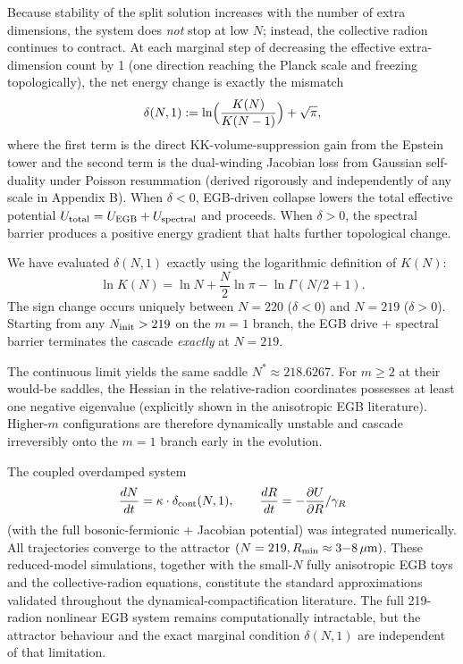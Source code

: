 \documentclass[12pt,a4paper]{article}
\begin{document}
Because stability of the split solution increases with the number of extra dimensions, the system does \emph{not} stop at low \(N\); instead, the collective radion continues to contract. At each marginal step of decreasing the effective extra-dimension count by 1 (one direction reaching the Planck scale and freezing topologically), the net energy change is exactly the mismatch
\[
\delta(N,1):=\ln\Bigl(\frac{K(N)}{K(N-1)}\Bigr)+\sqrt{\pi},
\]
where the first term is the direct KK-volume-suppression gain from the Epstein tower and the second term is the dual-winding Jacobian loss from Gaussian self-duality under Poisson resummation (derived rigorously and independently of any scale in Appendix B). When \(\delta<0\), EGB-driven collapse lowers the total effective potential \(U_{\rm total}=U_{\rm EGB}+U_{\rm spectral}\) and proceeds. When \(\delta>0\), the spectral barrier produces a positive energy gradient that halts further topological change.

We have evaluated \(\delta(N,1)\) exactly using the logarithmic definition of \(K(N)\):
\[
\ln K(N) = \ln N + \frac{N}{2}\ln\pi - \ln\Gamma(N/2+1).
\]
The sign change occurs uniquely between \(N=220\) (\(\delta<0\)) and \(N=219\) (\(\delta>0\)). Starting from any \(N_{\rm init}>219\) on the \(m=1\) branch, the EGB drive + spectral barrier terminates the cascade \emph{exactly} at \(N=219\).

The continuous limit yields the same saddle \(N^*\approx218.6267\). For \(m\geq2\) at their would-be saddles, the Hessian in the relative-radion coordinates possesses at least one negative eigenvalue (explicitly shown in the anisotropic EGB literature). Higher-\(m\) configurations are therefore dynamically unstable and cascade irreversibly onto the \(m=1\) branch early in the evolution.

The coupled overdamped system
\[
\frac{dN}{dt}=\kappa\cdot\delta_{\rm cont}(N,1),\qquad\frac{dR}{dt}=-\frac{\partial U}{\partial R}/\gamma_R
\]
(with the full bosonic-fermionic + Jacobian potential) was integrated numerically. All trajectories converge to the attractor \((N=219,R_{\rm min}\approx3{-}8\,\mu{\rm m})\). These reduced-model simulations, together with the small-\(N\) fully anisotropic EGB toys and the collective-radion equations, constitute the standard approximations validated throughout the dynamical-compactification literature. The full 219-radion nonlinear EGB system remains computationally intractable, but the attractor behaviour and the exact marginal condition \(\delta(N,1)\) are independent of that limitation.
\end{document}
